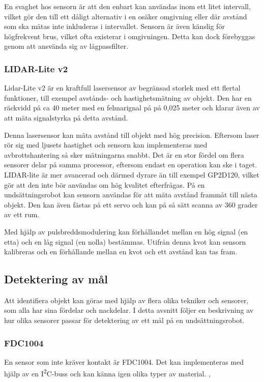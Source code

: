 \documentclass[11pt]{article}
\begin{document}
\begin{flushleft}
En svaghet hos sensorn är att den enbart kan användas inom ett litet intervall, vilket gör den till ett dåligt alternativ i en osäker omgivning eller där avstånd som ska mätas inte inkluderas i intervallet. Sensorn är även känslig för högfrekvent brus, vilket ofta existerar i omgivningen. Detta kan dock förebyggas genom att ansvända sig av lågpassfilter. \cite{Sharp}

\subsubsection{LIDAR-Lite v2}
Lidar-Lite v2 är en kraftfull lasersensor av begränsad storlek med ett flertal funktioner, till exempel avstånds- och hastighetsmätning av objekt. Den har en räckvidd på ca 40 meter med en felmarignal på på 0,025 meter och klarar även av att mäta signalstyrka på detta avstånd. \cite{Lidar}

Denna lasersensor kan mäta avstånd till objekt med hög precision. Eftersom laser rör sig med ljusets hastighet och sensorn kan implementeras med avbrottshantering så sker mätningarna snabbt. Det är en stor fördel om flera sensorer delar på samma processor, eftersom endast en operation kan ske i taget. LIDAR-lite är mer avancerad och därmed dyrare än till exempel GP2D120, vilket gör att den inte bör användas om hög kvalitet efterfrågas. På en undsättningsrobot kan sensorn användas för att mäta avstånd frammåt till nästa objekt. Den kan även fästas på ett servo och kan på så sätt scanna av 360 grader av ett rum. \cite{Lidar}

Med hjälp av pulsbreddsmodulering kan förhållandet mellan en hög signal (en etta) och en låg signal (en nolla) bestämmas. Utifrån denna kvot kan sensorn kalibreras och en förhållande mellan en kvot och ett avstånd kan tas fram. \cite{Lidar}

\subsection{Detektering av mål}
Att identifiera objekt kan göras med hjälp av flera olika tekniker och sensorer, som alla har sina fördelar och nackdelar. I detta avsnitt följer en beskrivning av hur olika sensorer passar för detektering av ett mål på en undsättningsrobot.


\subsubsection{FDC1004} %
En sensor som inte kräver kontakt är FDC1004. Det kan implementeras med hjälp av en I\textsuperscript{2}C-buss och kan känna igen olika typer av material. \cite{Texas}, \cite{Texas2}


\end{flushleft}
\end{document}
